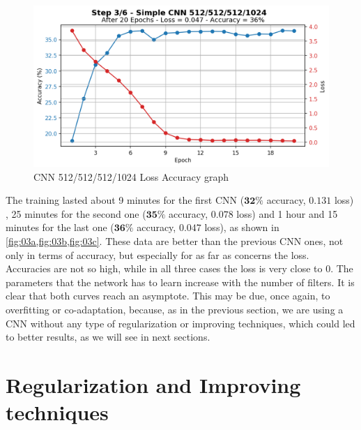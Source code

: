\documentclass[a4paper, 11pt]{article}
\begin{document}
	\begin{figure}[ht!]
		\centering
		\includegraphics[width=0.6\paperwidth]{img/fig03c.png}
		\caption{CNN 512/512/512/1024 Loss Accuracy graph}
		\label{fig:03c}
	\end{figure}
	
	The training lasted about 9 minutes for the first CNN ($\boldsymbol{32\%}$ accuracy, $\boldsymbol{0.131}$ loss)  , 25 minutes for the second one ($\boldsymbol{35\%}$ accuracy, $\boldsymbol{0.078}$ loss) and 1 hour and 15 minutes for the last one ($\boldsymbol{36\%}$ accuracy, $\boldsymbol{0.047}$ loss), as shown in \vref{fig:03a,fig:03b,fig:03c}.
	These data are better than the previous CNN ones, not only in terms of accuracy, but especially for as far as concerns the loss. Accuracies are not so high, while in all three cases the loss is very close to $0$. The parameters that the network has to learn increase with the number of filters. It is clear that both curves reach an asymptote.  
	This may be due, once again, to overfitting or co-adaptation, because, as in the previous section,  we are using a CNN without any type of regularization or improving techniques, which could led to better results, as we will see in next sections.
		
	\FloatBarrier
	
	\section{Regularization and Improving techniques}
		
	
	
	
	
	
\end{document}

